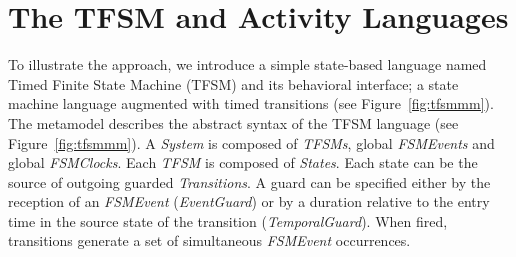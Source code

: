 \chapter{The TFSM and Activity Languages}
\label{ap:languages}


To illustrate the approach, we introduce a simple state-based language named Timed Finite State Machine (TFSM) and its behavioral interface; a state machine language augmented with timed transitions (see Figure~\ref{fig:tfsmmm}). The metamodel describes the abstract syntax of the TFSM language (see Figure~\ref{fig:tfsmmm}). A \emph{System} is composed of \emph{TFSMs}, global \emph{FSMEvents} and global \emph{FSMClocks}. Each \emph{TFSM} is composed of \emph{States}. Each state can be the source of outgoing guarded \emph{Transitions}. A guard can be specified either by the reception of an \emph{FSMEvent} (\emph{EventGuard}) or by a duration relative to the entry time in the source state of the transition (\emph{TemporalGuard}). When fired, transitions generate a set of simultaneous \emph{FSMEvent} occurrences.

